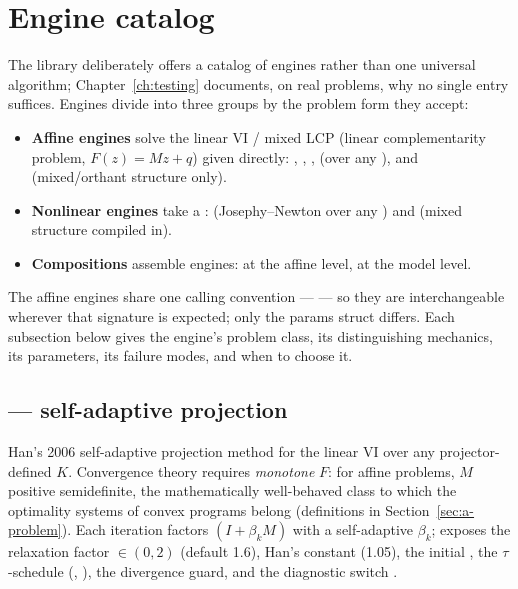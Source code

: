 \section{Engine catalog}
\label{sec:engines}

The library deliberately offers a catalog of engines rather than one
universal algorithm; Chapter~\ref{ch:testing} documents, on real problems,
why no single entry suffices. Engines divide into three groups by the
problem form they accept:

\begin{itemize}
\item \textbf{Affine engines} solve the linear VI / mixed LCP (linear
  complementarity problem, $F(z) = Mz + q$) given  directly:
  , , ,
   (over any ), and
   (mixed/orthant structure only).
\item \textbf{Nonlinear engines} take a :
   (Josephy--Newton over any ) and
   (mixed structure compiled in).
\item \textbf{Compositions} assemble engines:
   at the affine level,
   at the model level.
\end{itemize}

The affine engines share one calling convention ---
 ---
so they are interchangeable wherever that signature is expected; only the
params struct differs. Each subsection below gives the engine's problem
class, its distinguishing mechanics, its parameters, its failure modes, and
when to choose it.

\subsection{ --- self-adaptive projection}
\label{sec:dhan06}

Han's 2006 self-adaptive projection method for the linear VI over any
projector-defined $K$. Convergence theory requires \emph{monotone} $F$:
for affine problems, $M$ positive semidefinite, the mathematically
well-behaved class to which the optimality systems of convex programs
belong (definitions in Section~\ref{sec:a-problem}). Each iteration factors
$(I + \beta_k M)$ with a self-adaptive $\beta_k$; 
exposes the relaxation factor  $\in (0,2)$ (default 1.6), Han's
constant  (1.05), the initial , the $\tau$-schedule
(, ), the divergence guard, and the diagnostic switch
.

